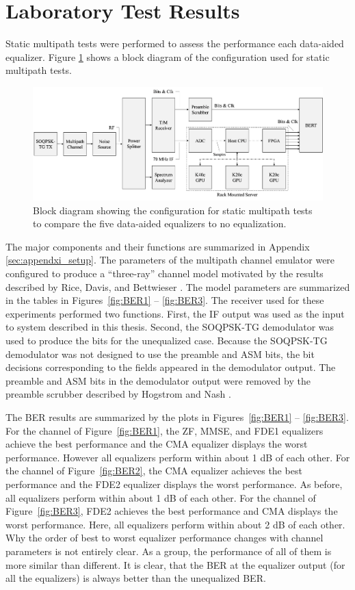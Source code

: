 \section{Laboratory Test Results}
Static multipath tests were performed to assess the performance each data-aided equalizer.
Figure \ref{fig:LabTestBlock} shows a block diagram of the configuration used for static multipath tests.
\begin{figure}
	\centering\includegraphics[width=\textheight]{figures/eq_GPUimplementation/MDRsystem.pdf}
	\caption{Block diagram showing the configuration for static multipath tests to compare the five data-aided equalizers to no equalization.}
	\label{fig:LabTestBlock}
\end{figure}
The major components and their functions are summarized in Appendix \ref{sec:appendxi_setup}.
The parameters of the multipath channel emulator were configured to produce a ``three-ray'' channel
model motivated by the results described by Rice, Davis, and Bettwieser \cite{rice-davis-bettwieser:2004}. 
The model parameters are summarized in the tables in Figures~\ref{fig:BER1} -- \ref{fig:BER3}.
The receiver used for these experiments performed two functions.
First, the IF output was used as the input to system described in this thesis.
Second, the SOQPSK-TG demodulator was used to produce the bits for the unequalized case. 
Because the SOQPSK-TG demodulator was not designed to use the preamble and ASM bits, the bit decisions
corresponding to the fields appeared in the demodulator output.
The preamble and ASM bits in the demodulator output were removed by the preamble scrubber described
by Hogstrom and Nash \cite{hog2016}.

The BER results are summarized by the plots in Figures~\ref{fig:BER1} -- \ref{fig:BER3}.
For the channel of Figure~\ref{fig:BER1}, the ZF, MMSE, and FDE1 equalizers achieve the best performance
and the CMA equalizer displays the worst performance. 
However all equalizers perform within about 1 dB of each other.
For the channel of Figure~\ref{fig:BER2}, the CMA equalizer achieves the best performance and the FDE2 equalizer
displays the worst performance.
As before, all equalizers perform within about 1 dB of each other.
For the channel of Figure~\ref{fig:BER3}, FDE2 achieves the best performance and CMA displays the worst performance.
Here, all equalizers perform within about 2 dB of each other.
Why the order of best to worst equalizer performance changes with channel parameters is not entirely clear.
As a group, the performance of all of them is more similar than different.
It is clear, that the BER at the equalizer output (for all the equalizers) is always better than the unequalized BER.


